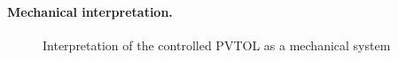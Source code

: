 \paragraph{Mechanical interpretation.}
\begin{figure}[ht]
 \centering
 
 \caption{Interpretation of the controlled PVTOL as a mechanical system}
 \label{fig:PVTOLPendulum}
\end{figure}


